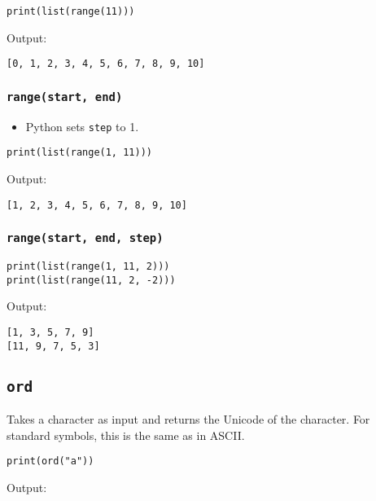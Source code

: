 \documentclass[11pt]{article}
\begin{document}
\begin{verbatim}
print(list(range(11)))
\end{verbatim}

 \noindent Output:

\label{org534d74c}
\begin{verbatim}
[0, 1, 2, 3, 4, 5, 6, 7, 8, 9, 10]
\end{verbatim}
\subsubsection{\texttt{range(start, end)}}
\label{sec:org596f5b9}
\begin{itemize}
\item Python sets \texttt{step} to 1.
\end{itemize}

\begin{verbatim}
print(list(range(1, 11)))
\end{verbatim}

 \noindent Output:

\label{org3be1038}
\begin{verbatim}
[1, 2, 3, 4, 5, 6, 7, 8, 9, 10]
\end{verbatim}
\subsubsection{\texttt{range(start, end, step)}}
\label{sec:org67ce35c}

\begin{verbatim}
print(list(range(1, 11, 2)))
print(list(range(11, 2, -2)))
\end{verbatim}

 \noindent Output:

\label{orgb4758c3}
\begin{verbatim}
[1, 3, 5, 7, 9]
[11, 9, 7, 5, 3]
\end{verbatim}
\subsection{\texttt{ord}}
\label{sec:org1b80984}
Takes a character as input and returns the Unicode of the character. For standard symbols, this is the same as in ASCII.

\begin{verbatim}
print(ord("a"))
\end{verbatim}

 \noindent Output:
\end{document}
